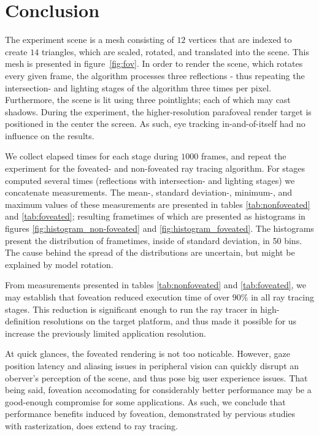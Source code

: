 
\section{Conclusion}
The experiment scene is a mesh consisting of $12$ vertices that are indexed to create $14$ triangles, which are scaled, rotated, and translated into the scene.
This mesh is presented in figure~\ref{fig:fov}.
In order to render the scene, which rotates every given frame, the algorithm processes three reflections - thus repeating the intersection- and lighting stages of the algorithm three times per pixel.
Furthermore, the scene is lit using three pointlights; each of which may cast shadows.
During the experiment, the higher-resolution parafoveal render target is positioned in the center the screen.
As such, eye tracking in-and-of-itself had no influence on the results.

We collect elapsed times for each stage during $1000$ frames, and repeat the experiment for the foveated- and non-foveated ray tracing algorithm.
For stages computed several times (reflections with intersection- and lighting stages) we concatenate measurements.
The mean-, standard deviation-, minimum-, and maximum values of these measurements are presented in tables \ref{tab:nonfoveated} and \ref{tab:foveated}; resulting frametimes of which are presented as histograms in figures \ref{fig:histogram_non-foveated} and \ref{fig:histogram_foveated}.
The histograms present the distribution of frametimes, inside of standard deviation, in 50 bins.
The cause behind the spread of the distributions are uncertain, but might be explained by model rotation.

From measurements presented in tables \ref{tab:nonfoveated} and \ref{tab:foveated}, we may establish that foveation reduced execution time of over $90\%$ in all ray tracing stages.
This reduction is significant enough to run the ray tracer in high-definition resolutions on the target platform, and thus made it possible for us increase the previously limited application resolution.

At quick glances, the foveated rendering is not too noticable.
However, gaze position latency and aliasing issues in peripheral vision can quickly disrupt an oberver's perception of the scene, and thus pose big user experience issues.
That being said, foveation accomodating for considerably better performance may be a good-enough compromise for some applications.
As such, we conclude that performance benefits induced by foveation, demonstrated by pervious studies~\cite{guenter12} with rasterization, does extend to ray tracing.

